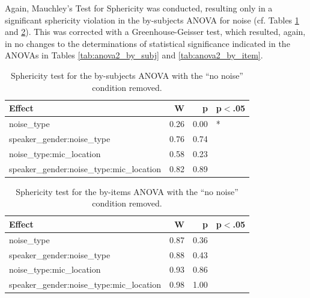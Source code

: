 \documentclass[dissertation,copyright]{uathesis}
\begin{document}
Again, Mauchley's Test for Sphericity was conducted, resulting only in a significant sphericity violation in the by-subjects ANOVA for noise (cf. Tables \ref{tab:anova2_subj_sph_test} and \ref{tab:anova2_item_sph_test}).  This was corrected with a Greenhouse-Geisser test, which resulted, again, in no changes to the determinations of statistical significance indicated in the ANOVAs in Tables \ref{tab:anova2_by_subj} and \ref{tab:anova2_by_item}.
\begin{table}[ht]
\centering
\begin{tabular}{lrrl}
  \hline
Effect & W & p & p$<$.05 \\ 
  \hline
noise\_type & 0.26 & 0.00 & * \\ 
  speaker\_gender:noise\_type & 0.76 & 0.74 &  \\ 
  noise\_type:mic\_location & 0.58 & 0.23 &  \\ 
  speaker\_gender:noise\_type:mic\_location & 0.82 & 0.89 &  \\ 
   \hline
\end{tabular}
\caption{Sphericity test for the by-subjects ANOVA with the ``no noise'' condition removed.} 
\label{tab:anova2_subj_sph_test}
\end{table}
\begin{table}[ht]
\centering
\begin{tabular}{lrrl}
  \hline
Effect & W & p & p$<$.05 \\ 
  \hline
noise\_type & 0.87 & 0.36 &  \\ 
  speaker\_gender:noise\_type & 0.88 & 0.43 &  \\ 
  noise\_type:mic\_location & 0.93 & 0.86 &  \\ 
  speaker\_gender:noise\_type:mic\_location & 0.98 & 1.00 &  \\ 
   \hline
\end{tabular}
\caption{Sphericity test for the by-items ANOVA with the ``no noise'' condition removed.} 
\label{tab:anova2_item_sph_test}
\end{table}




\end{document}
